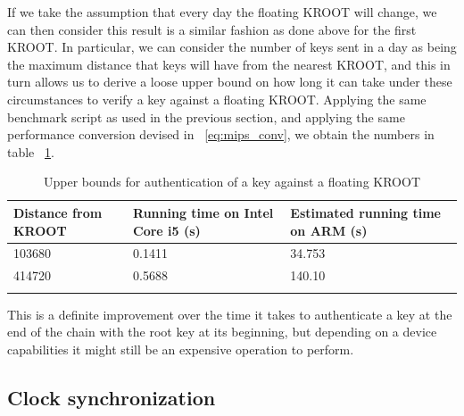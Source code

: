 If we take the assumption that every day the floating KROOT will change, we can
then consider this result is a similar fashion as done above for the first
KROOT. In particular, we can consider the number of keys sent in a day as being
the maximum distance that keys will have from the nearest KROOT, and this in
turn allows us to derive a loose upper bound on how long it can take under these
circumstances to verify a key against a floating KROOT. Applying the same
benchmark script as used in the previous section, and applying the same
performance conversion devised in ~\ref{eq:mips_conv}, we obtain the numbers in
table ~\ref{table:float_kroot}.

\begin{longtable}[]{@{}lll@{}}
\toprule
  Distance from KROOT & Running time on Intel Core i5 (s) & Estimated running
  time on ARM (s) \tabularnewline
\midrule
\endhead
  103680 & 0.1411 & 34.753 \tabularnewline
  414720 & 0.5688 & 140.10 \tabularnewline
\bottomrule
  \caption{Upper bounds for authentication of a key against a floating KROOT}
\label{table:float_kroot}
\end{longtable}

This is a definite improvement over the time it takes to authenticate a key at
the end of the chain with the root key at its beginning, but depending on a
device capabilities it might still be an expensive operation to perform.


\subsection{Clock synchronization}

